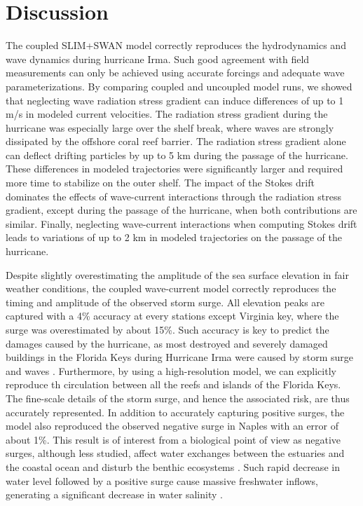 \documentclass[preprint,12pt,authoryear]{elsarticle}
\begin{document}
\section{Discussion}

The coupled SLIM+SWAN model correctly reproduces the hydrodynamics and wave dynamics during hurricane Irma. Such good agreement with field measurements can only be achieved using accurate forcings and adequate wave parameterizations. By comparing coupled and uncoupled model runs, we showed that neglecting wave radiation stress gradient can induce differences of up to 1 m/s in modeled current velocities. The radiation stress gradient during the hurricane was especially large over the shelf break, where waves are strongly dissipated by the offshore coral reef barrier. The radiation stress gradient alone can deflect drifting particles by up to 5 km during the passage of the hurricane. These differences in modeled trajectories were significantly larger and required more time to stabilize on   the outer shelf. The impact of the Stokes drift dominates the effects of wave-current interactions through the radiation stress gradient, except during the passage of the hurricane, when both contributions are similar. Finally, neglecting wave-current interactions when computing Stokes drift leads to variations of up to 2 km in modeled trajectories on the passage of the hurricane.

Despite slightly overestimating the amplitude of the sea surface elevation in fair weather conditions, the coupled wave-current model correctly reproduces the timing and amplitude of the observed storm surge. All elevation peaks are captured with a 4\% accuracy at every stations except Virginia key, where the surge was overestimated by about 15\%. Such accuracy is key to predict the damages caused by the hurricane, as most destroyed and severely damaged buildings in the Florida Keys during Hurricane Irma were caused by storm surge and waves \citep{xian2018brief}. Furthermore, by using a high-resolution model, we can explicitly reproduce th circulation between all the reefs and islands of the Florida Keys. The fine-scale details of the storm surge, and hence the associated risk, are thus accurately represented. In addition to accurately capturing positive surges, the model also reproduced the observed negative surge in Naples with an error of about 1\%. This result is of interest from a biological point of view as negative surges, although less studied, affect water exchanges between the estuaries and the coastal ocean and disturb the benthic ecosystems \citep{liu2020impacts}. Such rapid decrease in water level followed by a positive surge cause massive freshwater inflows, generating a significant decrease in water salinity \citep{wachnicka2019hurricane}.
\end{document}

